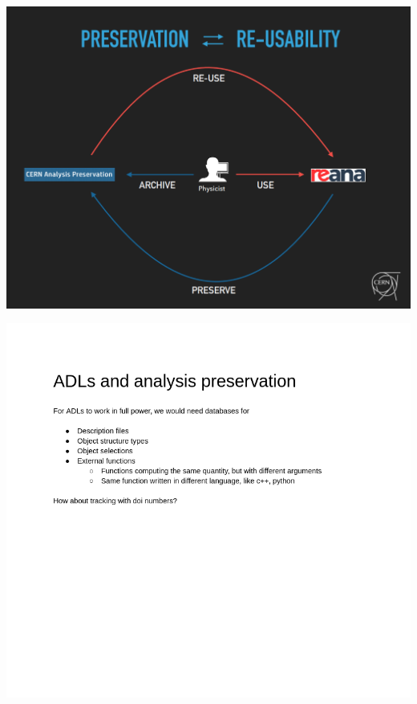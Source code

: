 \documentclass[aspectratio=169]{beamer}
\begin{document}
\begin{frame}{}
\vspace{-0.5 cm}
\begin{center}
\includegraphics[height=9.3 cm]{slides-20.png}
\end{center}
\end{frame}

\begin{frame}{}
\vspace{-0.5 cm}
\begin{center}
\includegraphics[height=9.3 cm]{slides-21.png}
\end{center}
\end{frame}
\end{document}
